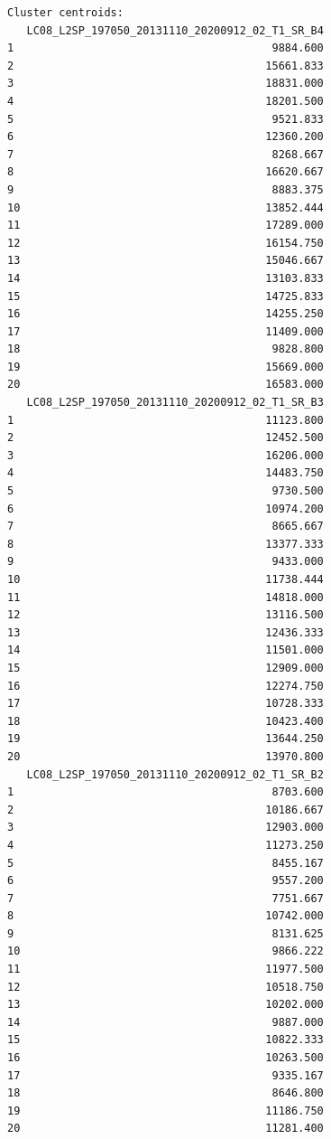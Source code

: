\documentclass[remotesensing,article,submit,pdftex,moreauthors]{Definitions/mdpi}
\begin{document}
\begin{scriptsize}
\begin{verbatim}
Cluster centroids:
   LC08_L2SP_197050_20131110_20200912_02_T1_SR_B4
1                                        9884.600
2                                       15661.833
3                                       18831.000
4                                       18201.500
5                                        9521.833
6                                       12360.200
7                                        8268.667
8                                       16620.667
9                                        8883.375
10                                      13852.444
11                                      17289.000
12                                      16154.750
13                                      15046.667
14                                      13103.833
15                                      14725.833
16                                      14255.250
17                                      11409.000
18                                       9828.800
19                                      15669.000
20                                      16583.000
   LC08_L2SP_197050_20131110_20200912_02_T1_SR_B3
1                                       11123.800
2                                       12452.500
3                                       16206.000
4                                       14483.750
5                                        9730.500
6                                       10974.200
7                                        8665.667
8                                       13377.333
9                                        9433.000
10                                      11738.444
11                                      14818.000
12                                      13116.500
13                                      12436.333
14                                      11501.000
15                                      12909.000
16                                      12274.750
17                                      10728.333
18                                      10423.400
19                                      13644.250
20                                      13970.800
   LC08_L2SP_197050_20131110_20200912_02_T1_SR_B2
1                                        8703.600
2                                       10186.667
3                                       12903.000
4                                       11273.250
5                                        8455.167
6                                        9557.200
7                                        7751.667
8                                       10742.000
9                                        8131.625
10                                       9866.222
11                                      11977.500
12                                      10518.750
13                                      10202.000
14                                       9887.000
15                                      10822.333
16                                      10263.500
17                                       9335.167
18                                       8646.800
19                                      11186.750
20                                      11281.400


\end{verbatim}
\end{scriptsize}
\end{document}

